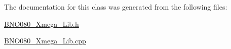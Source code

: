 The documentation for this class was generated from the following files\+:\begin{DoxyCompactItemize}
\item 
\mbox{\hyperlink{BNO080__Xmega__Lib_8h}{B\+N\+O080\+\_\+\+Xmega\+\_\+\+Lib.\+h}}\item 
\mbox{\hyperlink{BNO080__Xmega__Lib_8cpp}{B\+N\+O080\+\_\+\+Xmega\+\_\+\+Lib.\+cpp}}\end{DoxyCompactItemize}

